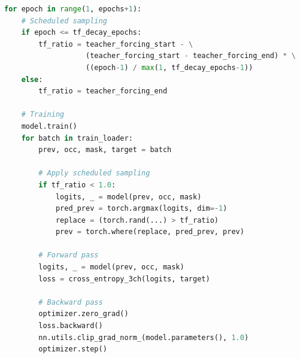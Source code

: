 \documentclass[12pt,a4paper]{article}
\begin{document}
\begin{lstlisting}[language=Python, caption=Training Implementation]
for epoch in range(1, epochs+1):
    # Scheduled sampling
    if epoch <= tf_decay_epochs:
        tf_ratio = teacher_forcing_start - \
                   (teacher_forcing_start - teacher_forcing_end) * \
                   ((epoch-1) / max(1, tf_decay_epochs-1))
    else:
        tf_ratio = teacher_forcing_end
    
    # Training
    model.train()
    for batch in train_loader:
        prev, occ, mask, target = batch
        
        # Apply scheduled sampling
        if tf_ratio < 1.0:
            logits, _ = model(prev, occ, mask)
            pred_prev = torch.argmax(logits, dim=-1)
            replace = (torch.rand(...) > tf_ratio)
            prev = torch.where(replace, pred_prev, prev)
        
        # Forward pass
        logits, _ = model(prev, occ, mask)
        loss = cross_entropy_3ch(logits, target)
        
        # Backward pass
        optimizer.zero_grad()
        loss.backward()
        nn.utils.clip_grad_norm_(model.parameters(), 1.0)
        optimizer.step()
\end{lstlisting}
\end{document}
